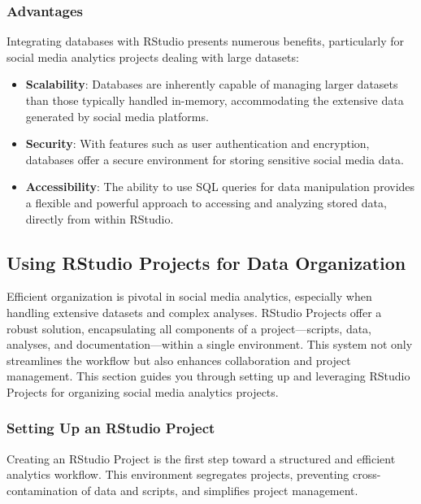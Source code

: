 \documentclass[
]{book}
\providecommand{\tightlist}{%
  \setlength{\itemsep}{0pt}\setlength{\parskip}{0pt}}
\begin{document}
\hypertarget{advantages}{%
\subsubsection{Advantages}\label{advantages}}

Integrating databases with RStudio presents numerous benefits, particularly for social media analytics projects dealing with large datasets:

\begin{itemize}
\tightlist
\item
  \textbf{Scalability}: Databases are inherently capable of managing larger datasets than those typically handled in-memory, accommodating the extensive data generated by social media platforms.
\item
  \textbf{Security}: With features such as user authentication and encryption, databases offer a secure environment for storing sensitive social media data.
\item
  \textbf{Accessibility}: The ability to use SQL queries for data manipulation provides a flexible and powerful approach to accessing and analyzing stored data, directly from within RStudio.
\end{itemize}

\hypertarget{using-rstudio-projects-for-data-organization}{%
\subsection{Using RStudio Projects for Data Organization}\label{using-rstudio-projects-for-data-organization}}

Efficient organization is pivotal in social media analytics, especially when handling extensive datasets and complex analyses. RStudio Projects offer a robust solution, encapsulating all components of a project---scripts, data, analyses, and documentation---within a single environment. This system not only streamlines the workflow but also enhances collaboration and project management. This section guides you through setting up and leveraging RStudio Projects for organizing social media analytics projects.

\hypertarget{setting-up-an-rstudio-project}{%
\subsubsection{Setting Up an RStudio Project}\label{setting-up-an-rstudio-project}}

Creating an RStudio Project is the first step toward a structured and efficient analytics workflow. This environment segregates projects, preventing cross-contamination of data and scripts, and simplifies project management.
\end{document}
